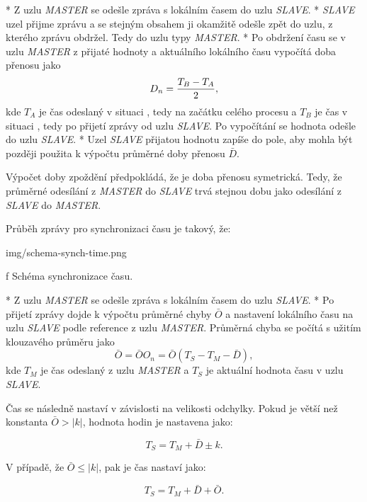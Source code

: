 \begitems
* {\sbf [A]} Z uzlu {\em MASTER} se odešle zpráva s lokálním časem do uzlu {\em SLAVE}.
* {\sbf [B]} {\em SLAVE} uzel přijme zprávu a se stejným obsahem ji okamžitě odešle zpět do uzlu, z kterého zprávu obdržel. Tedy do uzlu typy {\em MASTER}.
* {\sbf [C]} Po obdržení času se v uzlu {\em MASTER} z přijaté hodnoty a aktuálního lokálního času vypočítá doba přenosu jako
$$
D_n = {{T_B - T_A}\over{2}},
$$
kde $T_A$ je čas odeslaný v situaci {\sbf [A]}, tedy na začátku celého procesu a $T_B$ je čas v situaci {\sbf [C]}, tedy po přijetí zprávy od uzlu {\em SLAVE}. Po vypočítání se hodnota odešle do uzlu {\em SLAVE}.
* {\sbf [D]} Uzel {\em SLAVE} přijatou hodnotu zapíše do pole, aby mohla být později použita k výpočtu průměrné doby přenosu $\bar{D}$.
\enditems

Výpočet doby zpoždění předpokládá, že je doba přenosu symetrická. Tedy, že průměrné odesílání z {\em MASTER} do {\em SLAVE} trvá stejnou dobu jako odesílání z {\em SLAVE} do {\em MASTER}.

Průběh zprávy pro synchronizaci {\sbf času} je takový, že:

\medskip
{}
\picw=16cm \cinspic img/schema-synch-time.png
\caption/f Schéma synchronizace času.
\medskip

\begitems
* {\sbf [A]} Z uzlu {\em MASTER} se odešle zpráva s lokálním časem do uzlu {\em SLAVE}.
* {\sbf [B]} Po přijetí zprávy dojde k výpočtu průměrné chyby $\bar{O}$ a nastavení lokálního času na uzlu {\em SLAVE} podle reference z uzlu {\em MASTER}. Průměrná chyba se počítá s užitím klouzavého průměru jako 
$$
\bar{O} = \bar{O} O_n = \bar{O} (T_S - T_M - \bar{D}),
$$
kde $T_M$ je čas odeslaný z uzlu {\em MASTER} a $T_S$ je aktuální hodnota času v uzlu {\em SLAVE}.

Čas se následně nastaví v závislosti na velikosti odchylky. Pokud je větší než konstanta $\bar{O} > | k |$, hodnota hodin je nastavena jako:

$$
T_S = T_M + \bar{D} \pm k.
$$

V případě, že $\bar{O} \leq | k |$, pak je čas nastaví jako:

$$
T_S = T_M + \bar{D} + \bar{O}.
$$
\enditems

